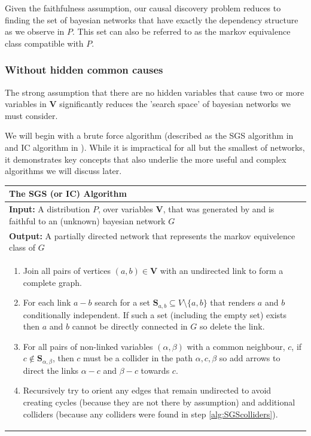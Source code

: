 \documentclass[11pt,a4paper,oneside]{book}
\begin{document}
Given the faithfulness assumption, our causal discovery problem reduces to finding the set of bayesian networks that have exactly the dependency structure as we observe in $P$. This set can also be referred to as the markov equivalence class compatible with $P$.

\subsubsection{Without hidden common causes}
The strong assumption that there are no hidden variables that cause two or more variables in $\boldsymbol{V}$ significantly reduces the 'search space' of bayesian networks we must consider. 

We will begin with a brute force algorithm (described as the SGS algorithm in \cite{Sprites} and IC algorithm in \cite{Pearl2000}). While it is impractical for all but the smallest of networks, it demonstrates key concepts that also underlie the more useful and complex algorithms we will discuss later. 

\begin{table}[H]
 \begin{tabularx}{\textwidth}{X}
 \hline
\rule{0pt}{2.5ex} 
 \textbf{The SGS (or IC) Algorithm}\\
 \hline
 \rule{0pt}{2.5ex}
\textbf{Input:} A distribution $P$, over variables $\boldsymbol{V}$, that was generated by and is faithful to an (unknown) bayesian network $G$\\
\textbf{Output:} A partially directed network that represents the markov equivelence class of $G$\\
 \begin{enumerate}[itemsep=8pt]
  \item Join all pairs of vertices $(a,b) \in \boldsymbol{V}$ with an undirected link to form a complete graph.
  \item For each link $a-b$ search for a set $\boldsymbol{S}_{a,b} \subseteq V \setminus \{a,b\}$ that renders $a$ and $b$ conditionally independent. If such a set (including the empty set) exists then $a$ and $b$ cannot be directly connected in $G$ so delete the link.
  \label{alg:SGSexponential}
  
  \item For all pairs of non-linked variables $(\alpha,\beta)$ with a common neighbour, $c$, if $c \notin \boldsymbol{S}_{\alpha,\beta}$, then $c$ must be a collider in the path $\alpha,c,\beta$ so  add arrows to direct the links $\alpha-c$ and $\beta-c$ towards $c$.
  \label{alg:SGScolliders}  
  \item Recursively try to orient any edges that remain undirected to avoid creating cycles (because they are not there by assumption) and additional colliders (because any colliders were found in step \ref{alg:SGScolliders}).
  \label{alg:SGSfinal}
\end{enumerate}\\
 \hline
\end{tabularx}
\end{table}
\end{document}
